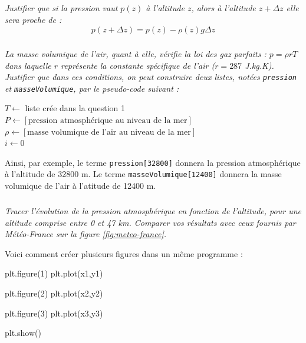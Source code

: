 \documentclass[10pt]{article}
\begin{document}
\subparagraph{}
\textit{Justifier que si la pression vaut $p(z)$ à l'altitude $z$, alors à l'altitude $z+\Delta z$ elle sera proche de :
\[p(z+\Delta z)=p(z)-\rho(z) g \Delta z\] }

\subparagraph{}\textit{
La masse volumique de l'air, quant à elle, vérifie la loi des gaz parfaits : $p=\rho r T$ dans laquelle $r$ représente la constante spécifique de l'air ($r=287$ J.kg.K). Justifier que dans ces conditions, on peut construire deux listes, notées
\texttt{pression} et \texttt{masseVolumique}, par le pseudo-code suivant :}

\begin{pseudo}
\begin{algorithm}[H]
$T\gets$ liste crée dans la question 1\\
$P \gets [\text{pression atmosphérique au niveau de la mer}]$\\
$\rho \gets [\text{masse volumique de l'air au niveau de la mer}]$\\
$i\gets 0$\\
\end{algorithm}
\end{pseudo}

Ainsi, par exemple, le terme \texttt{pression[32800]} donnera la pression atmosphérique à l'altitude de 32800 m. Le terme \texttt{masseVolumique[12400]} donnera la masse volumique de l'air à l'atitude de 12400 m.


\subparagraph{}
\textit{Tracer l'évolution de la pression atmosphérique en fonction de l'altitude, pour une altitude comprise entre 0 et 47 km. Comparer vos résultats avec ceux fournis par Météo-France sur la figure \ref{fig:meteo-france}.}



\begin{py}
Voici comment créer plusieurs figures dans un même programme :

\begin{python}
plt.figure(1)
plt.plot(x1,y1)		

plt.figure(2)
plt.plot(x2,y2)

plt.figure(3)
plt.plot(x3,y3)

plt.show()
\end{python}
\end{py} 
\end{document}
